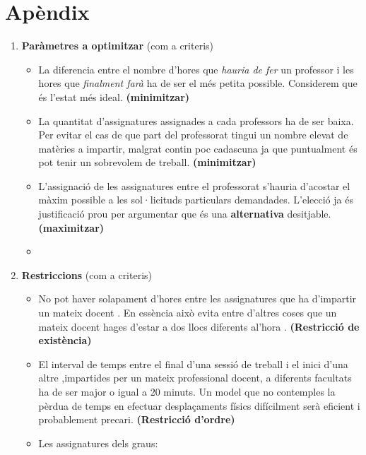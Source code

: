 \documentclass[10pt,twocolumn]{article}
\begin{document}
\section*{Apèndix}
\begin{enumerate}
	\item \textbf{Paràmetres a optimitzar } (com a criteris) 
	\begin{itemize}
		\item La diferencia entre el nombre d'hores que \textit{hauria de fer} un professor i les hores que \textit{finalment farà} ha de ser el més petita possible. {\color{gray} Considerem que és l'estat més ideal.} \textbf{(minimitzar)} 
		\item La quantitat d'assignatures assignades a cada professors ha de ser baixa. 
		{\color{gray}  Per evitar el cas de que part del professorat tingui un nombre elevat de matèries a impartir, malgrat contin poc cadascuna ja que puntualment és pot tenir un sobrevolem de treball.} \textbf{(minimitzar)}
		\item L'assignació de les assignatures entre el professorat s'hauria d'acostar el màxim possible a les sol·licituds particulars demandades. {\color{gray}  L'elecció ja és justificació prou per argumentar que és una \textbf{alternativa} desitjable.} \textbf{(maximitzar)}
		\item 
	\end{itemize}
    \item \textbf{Restriccions} (com a criteris)
    \begin{itemize}
    	\item No pot haver solapament d'hores entre les assignatures que ha d'impartir un mateix docent . {\color{gray} En essència això evita entre d'altres coses que un mateix docent hages d'estar a dos llocs diferents al'hora .} \textbf{(Restricció de existència)} 
    	\item El interval de temps entre el final d'una sessió de treball i el inici d'una altre ,impartides per un mateix professional docent, a diferents facultats ha de ser major o igual a 20 minuts. {\color{gray} Un model que no contemples la pèrdua de temps en efectuar desplaçaments físics difícilment serà eficient i probablement precari.} \textbf{(Restricció d'ordre)} 
    	\item Les assignatures dels graus:

\end{itemize}
\end{enumerate}
\end{document}
